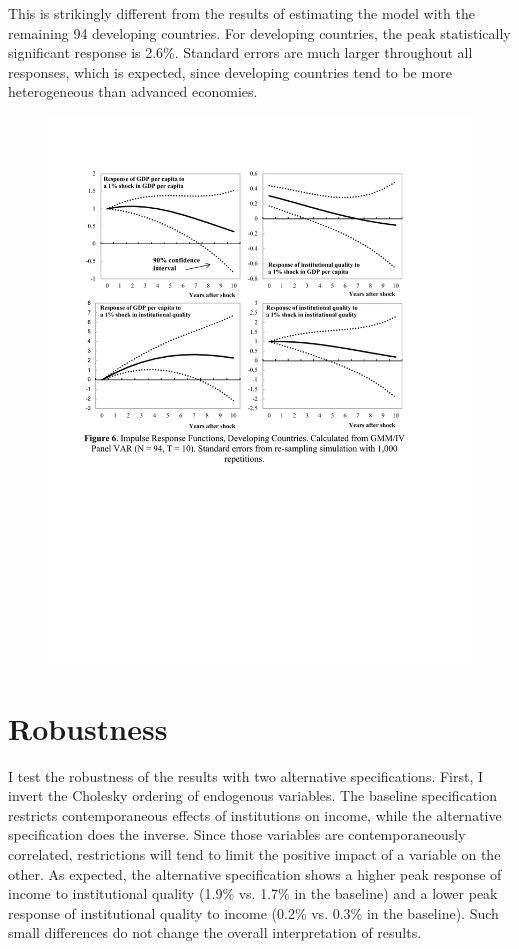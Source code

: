 \documentclass{article}
\begin{document}
This is strikingly different from the results of estimating the model with the remaining 94 developing countries. For developing countries, the peak statistically significant response is 2.6\%. Standard errors are much larger throughout all responses, which is expected, since developing countries tend to be more heterogeneous than advanced economies. 

\newpage


\begin{figure}[ht]
\begin{center}
    \includegraphics[scale=0.675]{developing.pdf}
\end{center}
\end{figure}

\section{Robustness}

I test the robustness of the results with two alternative specifications. First, I invert the Cholesky ordering of endogenous variables. The baseline specification restricts  contemporaneous effects of institutions on income, while the alternative specification does the inverse. Since those variables are contemporaneously correlated, restrictions will tend to limit the positive impact of a variable on the other. As expected, the alternative specification shows a higher peak response of income to institutional quality (1.9\% vs. 1.7\% in the baseline) and a lower peak response of institutional quality to income (0.2\% vs. 0.3\% in the baseline). Such small differences do not change the overall interpretation of results.
\end{document}
